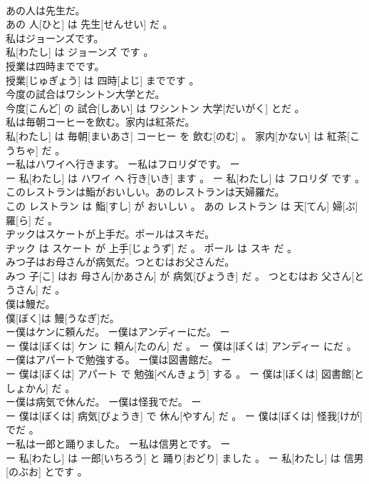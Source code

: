 \documentclass[8pt]{extreport}
\begin{document}
\begin{CJK}{UTF8}{min}
\\	あの人は先生だ。	
\\	あの 人[ひと] は 先生[せんせい] だ 。
\\	私はジョーンズです。	
\\	私[わたし] は ジョーンズ です 。
\\	授業は四時までです。	
\\	授業[じゅぎょう] は 四時[よじ] までです 。
\\	今度の試合はワシントン大学とだ。	
\\	今度[こんど] の 試合[しあい] は ワシントン 大学[だいがく] とだ 。
\\	私は毎朝コーヒーを飲む。家内は紅茶だ。	
\\	私[わたし] は 毎朝[まいあさ] コーヒー を 飲む[のむ] 。 家内[かない] は 紅茶[こうちゃ] だ 。
\\	ー私はハワイへ行きます。 ー私はフロリダです。	ー
\\	ー 私[わたし] は ハワイ へ 行き[いき] ます 。 ー 私[わたし] は フロリダ です 。
\\	このレストランは鮨がおいしい。あのレストランは天婦羅だ。	
\\	この レストラン は 鮨[すし] が おいしい 。 あの レストラン は 天[てん] 婦[ぷ] 羅[ら] だ 。
\\	ヂックはスケートが上手だ。ポールはスキだ。	
\\	ヂック は スケート が 上手[じょうず] だ 。 ポール は スキ だ 。
\\	みつ子はお母さんが病気だ。つとむはお父さんだ。	
\\	みつ 子[こ] はお 母さん[かあさん] が 病気[びょうき] だ 。 つとむはお 父さん[とうさん] だ 。
\\	僕は鰻だ。	
\\	僕[ぼく]は 鰻[うなぎ]だ。
\\	ー僕はケンに頼んだ。 ー僕はアンディーにだ。	ー
\\	ー 僕は[ぼくは] ケン に 頼ん[たのん] だ 。 ー 僕は[ぼくは] アンディー にだ 。
\\	ー僕はアパートで勉強する。 ー僕は図書館だ。	ー
\\	ー 僕は[ぼくは] アパート で 勉強[べんきょう] する 。 ー 僕は[ぼくは] 図書館[としょかん] だ 。
\\	ー僕は病気で休んだ。 ー僕は怪我でだ。	ー
\\	ー 僕は[ぼくは] 病気[びょうき] で 休ん[やすん] だ 。 ー 僕は[ぼくは] 怪我[けが] でだ 。
\\	ー私は一郎と踊りました。 ー私は信男とです。	ー
\\	ー 私[わたし] は 一郎[いちろう] と 踊り[おどり] ました 。 ー 私[わたし] は 信男[のぶお] とです 。

\end{CJK}
\end{document}
